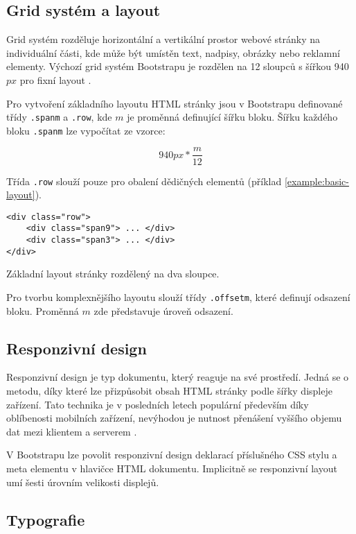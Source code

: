 \subsection{Grid systém a layout}

Grid systém rozděluje horizontální a vertikální prostor webové stránky na individuální části, kde může být umístěn text, nadpisy, obrázky nebo reklamní elementy. Výchozí grid systém Bootstrapu je rozdělen na 12 sloupců s šířkou 940$px$ pro fixní layout \cite{19}.

Pro vytvoření základního layoutu HTML stránky jsou v Bootstrapu definované třídy \texttt{.spanm} a \texttt{.row}, kde $m$ je proměnná definující šířku bloku. Šířku každého bloku \texttt{.spanm} lze vypočítat ze vzorce:

$$940px * \frac{m}{12}$$

Třída \texttt{.row} slouží pouze pro obalení dědičných elementů (příklad \ref{example:basic-layout}).

\begin{example}
    \centering
    \begin{lstlisting}
<div class="row">
    <div class="span9"> ... </div>
    <div class="span3"> ... </div>
</div>
    \end{lstlisting}
    \caption{Základní layout stránky rozdělený na dva sloupce.}
    \label{example:basic-layout}
\end{example}

Pro tvorbu komplexnějšího layoutu slouží třídy \texttt{.offsetm}, které definují odsazení bloku. Proměnná $m$ zde představuje úroveň odsazení.

\subsection{Responzivní design}

Responzivní design je typ dokumentu, který reaguje na své prostředí. Jedná se o metodu, díky které lze přizpůsobit obsah HTML stránky podle šířky displeje zařízení. Tato technika je v posledních letech populární především díky oblíbenosti mobilních zařízení, nevýhodou je nutnost přenášení vyššího objemu dat mezi klientem a serverem \cite{6} \cite{15} \cite{19}.

V Bootstrapu lze povolit responzivní design deklarací příslušného CSS stylu a meta elementu v hlavičce HTML dokumentu. Implicitně se responzivní layout umí  šesti úrovním velikosti displejů.

\subsection{Typografie}

